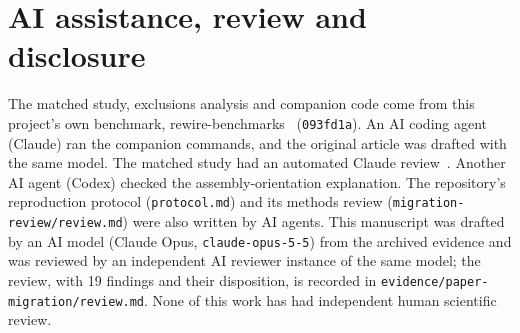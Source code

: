 \documentclass[11pt]{article}
\begin{document}
\section{AI assistance, review and disclosure}\label{sec:disclosure}
The matched study, exclusions analysis and companion code come from this project's own benchmark,
rewire-benchmarks~\citep{rb_mfass_readme} (\texttt{093fd1a}). An AI coding agent (Claude) ran the companion
commands, and the original article was drafted with the same model. The matched study had an automated Claude
review~\citep{rb_matched_review}. Another AI agent (Codex) checked the assembly-orientation explanation. The
repository's reproduction protocol (\texttt{protocol.md}) and its methods review (\texttt{migration-review/review.md}) were
also written by AI agents. This manuscript was drafted by an AI model (Claude Opus, \texttt{claude-opus-5-5}) from the
archived evidence and was reviewed by an independent AI reviewer instance of the same model; the review, with 19
findings and their disposition, is recorded in \texttt{evidence/paper-migration/review.md}. None of this work has had
independent human scientific review.




\clearpage
\appendix
\end{document}

